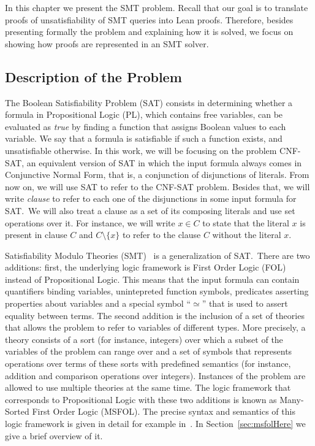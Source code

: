 In this chapter we present the SMT problem. Recall that our goal is to translate proofs of unsatisfiability of SMT queries into Lean proofs. Therefore, besides presenting formally the problem and explaining how it is solved, we focus on showing how proofs are represented in an SMT solver.

\subsection{Description of the Problem}

The Boolean Satisfiability Problem (SAT) consists in determining whether a formula in Propositional Logic (PL), which contains free variables, can be evaluated as \textit{true} by finding a function that assigns Boolean values to each variable.
We say that a formula is satisfiable if such a function exists, and unsatisfiable otherwise. In
this work, we will be focusing on the problem CNF-SAT, an equivalent version of SAT in
which the input formula always comes in Conjunctive Normal Form, that is, a conjunction
of disjunctions of literals. From now on, we will use SAT to refer to the CNF-SAT problem. Besides that, we will write \textit{clause} to refer to each one of the disjunctions in some
input formula for SAT.\ We will also treat a clause as a set of its composing literals and use set operations over it. For instance, we will write $x \in C$ to state that the literal $x$ is present in clause $C$ and $C \setminus \{x\}$ to refer to the clause $C$ without the literal $x$.


Satisfiability Modulo Theories (SMT)~\cite{smt} is a generalization of SAT.\
There are two additions: first, the underlying logic framework is First Order
Logic (FOL) instead of Propositional Logic. This means that the input formula
can contain quantifiers binding variables, unintepreted function symbols,
predicates asserting properties about variables and a special symbol ``$\simeq$'' that is used to assert equality between terms. %
The second addition is the inclusion of a set of theories that
allows the problem to refer to variables of different types. More
precisely, a theory consists of a sort (for instance, integers) over which a
subset of the variables of the problem can range over and a set of symbols
that represents operations over terms of these sorts with predefined semantics (for
instance, addition and comparison operations over integers). Instances of the
problem are allowed to use multiple theories at the same time. The logic
framework that corresponds to Propositional Logic with these two additions is
known as Many-Sorted First Order Logic (MSFOL). The precise syntax and semantics of this logic framework
is given in detail for example in~\cite{many_sorted}. In
Section~\ref{sec:msfolHere} we give a brief overview of it.

